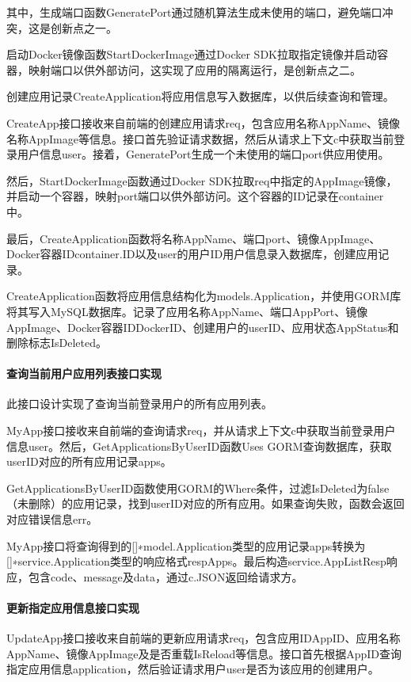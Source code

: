 \documentclass{HDU-Bachelor-Thesis}
\begin{document}
其中，生成端口函数GeneratePort通过随机算法生成未使用的端口，避免端口冲突，这是创新点之一。

启动Docker镜像函数StartDockerImage通过Docker SDK拉取指定镜像并启动容器，映射端口以供外部访问，这实现了应用的隔离运行，是创新点之二。

创建应用记录CreateApplication将应用信息写入数据库，以供后续查询和管理。

CreateApp接口接收来自前端的创建应用请求req，包含应用名称AppName、镜像名称AppImage等信息。接口首先验证请求数据，然后从请求上下文c中获取当前登录用户信息user。接着，GeneratePort生成一个未使用的端口port供应用使用。

然后，StartDockerImage函数通过Docker SDK拉取req中指定的AppImage镜像，并启动一个容器，映射port端口以供外部访问。这个容器的ID记录在container中。

最后，CreateApplication函数将名称AppName、端口port、镜像AppImage、Docker容器IDcontainer.ID以及user的用户ID用户信息录入数据库，创建应用记录。

CreateApplication函数将应用信息结构化为models.Application，并使用GORM库将其写入MySQL数据库。记录了应用名称AppName、端口AppPort、镜像AppImage、Docker容器IDDockerID、创建用户的userID、应用状态AppStatus和删除标志IsDeleted。

\paragraph{查询当前用户应用列表接口实现}

此接口设计实现了查询当前登录用户的所有应用列表。

MyApp接口接收来自前端的查询请求req，并从请求上下文c中获取当前登录用户信息user。然后，GetApplicationsByUserID函数Uses GORM查询数据库，获取userID对应的所有应用记录apps。

GetApplicationsByUserID函数使用GORM的Where条件，过滤IsDeleted为false（未删除）的应用记录，找到userID对应的所有应用。如果查询失败，函数会返回对应错误信息err。

MyApp接口将查询得到的[]∗model.Application类型的应用记录apps转换为[]∗service.Application类型的响应格式respApps。最后构造service.AppListResp响应，包含code、message及data，通过c.JSON返回给请求方。

\paragraph{更新指定应用信息接口实现}

UpdateApp接口接收来自前端的更新应用请求req，包含应用IDAppID、应用名称AppName、镜像AppImage及是否重载IsReload等信息。接口首先根据AppID查询指定应用信息application，然后验证请求用户user是否为该应用的创建用户。
\end{document}
